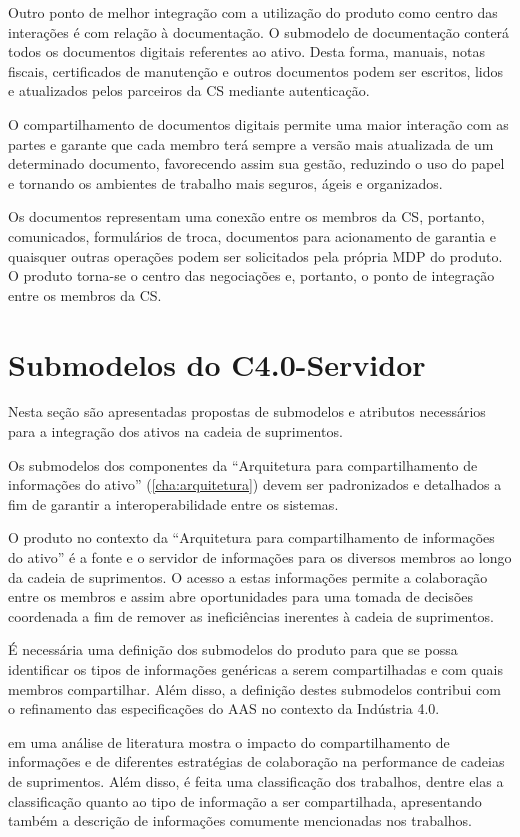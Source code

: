 Outro ponto de melhor integração com a utilização do produto como centro das interações é com relação à documentação. O submodelo de documentação conterá todos os documentos digitais referentes ao ativo. Desta forma, manuais, notas fiscais, certificados de manutenção e outros documentos podem ser escritos, lidos e atualizados pelos parceiros da CS mediante autenticação.

O compartilhamento de documentos digitais permite uma maior interação com as partes e garante que cada membro terá sempre a versão mais atualizada de um determinado documento, favorecendo assim sua gestão, reduzindo o uso do papel e tornando os ambientes de trabalho mais seguros, ágeis e organizados.

Os documentos representam uma conexão entre os membros da CS, portanto, comunicados, formulários de troca, documentos para acionamento de garantia e quaisquer outras operações podem ser solicitados pela própria MDP do produto. O produto torna-se o centro das negociações e, portanto, o ponto de integração entre os membros da CS.

\section{Submodelos do C4.0-Servidor}

Nesta seção são apresentadas propostas de submodelos e atributos necessários para a integração dos ativos na cadeia de suprimentos.

Os submodelos dos componentes da ``Arquitetura para compartilhamento de informações do ativo'' (\autoref{cha:arquitetura}) devem ser padronizados e detalhados a fim de garantir a interoperabilidade entre os sistemas.

O produto no contexto da ``Arquitetura para compartilhamento de informações do ativo'' é a fonte e o servidor de informações para os diversos membros ao longo da cadeia de suprimentos. O acesso a estas informações permite a colaboração entre os membros e assim abre oportunidades para uma tomada de decisões coordenada a fim de remover as ineficiências inerentes à cadeia de suprimentos.

É necessária uma definição dos submodelos do produto para que se possa identificar os tipos de informações genéricas a serem compartilhadas e com quais membros compartilhar. Além disso, a definição destes submodelos contribui com o refinamento das especificações do AAS no contexto da Indústria 4.0.

 em uma análise de literatura mostra o impacto do compartilhamento de informações e de diferentes estratégias de colaboração na performance de cadeias de suprimentos. Além disso, é feita uma classificação dos trabalhos, dentre elas a classificação quanto ao tipo de informação a ser compartilhada, apresentando também a descrição de informações comumente mencionadas nos trabalhos.

